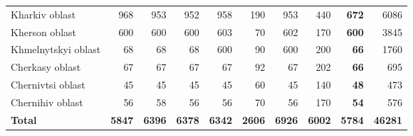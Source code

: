 \begin{table}[t]
{\begin{tabular}{lrrrrrrr>{\bfseries}rr}
Kharkiv oblast & 968 & 953 & 952 & 958 & 190 & 953 & 440 & 672 & 6086\\
\addlinespace
\rowcolor{gray!6}  Kherson oblast & 600 & 600 & 600 & 603 & 70 & 602 & 170 & 600 & 3845\\
Khmelnytskyi oblast & 68 & 68 & 68 & 600 & 90 & 600 & 200 & 66 & 1760\\
\rowcolor{gray!6}  Cherkasy oblast & 67 & 67 & 67 & 67 & 92 & 67 & 202 & 66 & 695\\
Chernivtsi oblast & 45 & 45 & 45 & 45 & 60 & 45 & 140 & 48 & 473\\
\rowcolor{gray!6}  Chernihiv oblast & 56 & 58 & 56 & 56 & 70 & 56 & 170 & 54 & 576\\
\addlinespace
\textbf{Total} & \textbf{5847} & \textbf{6396} & \textbf{6378} & \textbf{6342} & \textbf{2606} & \textbf{6926} & \textbf{6002} & \textbf{5784} & \textbf{46281}\\
\bottomrule
\end{tabular}}
\end{table}